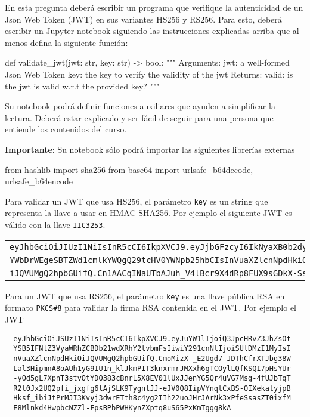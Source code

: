 
En esta pregunta deberá escribir un programa que verifique la autenticidad de un Json Web Token (JWT) en sus variantes HS256 y RS256. Para esto, deberá escribir un Jupyter notebook siguiendo las instrucciones explicadas arriba que al menos defina la siguiente función:

\begin{python}
def validate_jwt(jwt: str, key: str) -> bool:
    """
    Arguments:
      jwt: a well-formed Json Web Token
      key: the key to verify the validity of the jwt
    Returns:
      valid: is the jwt is valid w.r.t the provided key?
    """
\end{python}
Su notebook podrá definir funciones auxiliares que ayuden a simplificar la lectura. Deberá estar explicado y ser fácil de seguir para una persona que entiende los contenidos del curso.

\textbf{Importante}: Su notebook sólo podrá importar las siguientes librerías externas
\begin{python}
from hashlib import sha256
from base64 import urlsafe_b64decode, urlsafe_b64encode
\end{python}


Para validar un JWT que usa HS256, el parámetro \texttt{key} es un string que representa la llave a usar en HMAC-SHA256. Por ejemplo el siguiente JWT es válido con la llave \texttt{IIC3253}.

\begin{tabular}{l}
  \texttt{eyJhbGciOiJIUzI1NiIsInR5cCI6IkpXVCJ9.eyJjbGFzcyI6IkNyaXB0b2dy}\\
  \texttt{YWbDrWEgeSBTZWd1cmlkYWQgQ29tcHV0YWNpb25hbCIsInVuaXZlcnNpdHkiO}\\
  \texttt{iJQVUMgQ2hpbGUifQ.Cn1AACqINaUTbAJuh\_V4lBcr9X4dRp8FUX9sGDkX-Ss}
\end{tabular}

Para un JWT que usa RS256, el parámetro \texttt{key} es una llave pública RSA en formato \texttt{PKCS\#8} para validar la firma RSA contenida en el JWT. Por ejemplo el JWT

\begin{verbatim}
  eyJhbGciOiJSUzI1NiIsInR5cCI6IkpXVCJ9.eyJuYW1lIjoiQ3JpcHRvZ3JhZsOt
  YSB5IFNlZ3VyaWRhZCBDb21wdXRhY2lvbmFsIiwiY291cnNlIjoiSUlDMzI1MyIsI
  nVuaXZlcnNpdHkiOiJQVUMgQ2hpbGUifQ.CmoMizX-_E2Ugd7-JDThCfrXTJbg38W
  Lal3HipmnA8oAUh1yG9IU1n_klJkmPIT3knxrmrJMXxh6gTCOylLQfKSQI7pHsYUr
  -yOd5gL7XpnT3stvOtYDO383cBnrL5X8EV01lUxJJenYG5Qr4uVG7Msg-4fUJbTqT
  R2t0Jx2UQ2pfi_jxgfg6lAjSLK9TygntJJ-eJV0Q8IipVYnqtCxBS-OIXekalyjpB
  Hksf_ibiJtPrMJI3Kvyj3dwrETth8c4yg2IIh22uoJHrJArNk3xPfeSsasZT0ixfM
  E8Mlnkd4HwpbcNZZl-FpsBPbPWHKynZXptq8uS65PxKmTggg8kA
\end{verbatim}

